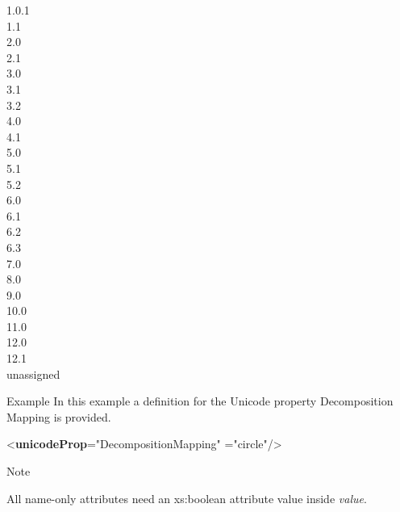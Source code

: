\begin{reflist}
\begin{sansreflist}
\begin{reflist}
\begin{description}
\item[{1.0.1}]
\item[{1.1}]
\item[{2.0}]
\item[{2.1}]
\item[{3.0}]
\item[{3.1}]
\item[{3.2}]
\item[{4.0}]
\item[{4.1}]
\item[{5.0}]
\item[{5.1}]
\item[{5.2}]
\item[{6.0}]
\item[{6.1}]
\item[{6.2}]
\item[{6.3}]
\item[{7.0}]
\item[{8.0}]
\item[{9.0}]
\item[{10.0}]
\item[{11.0}]
\item[{12.0}]
\item[{12.1}]
\item[{unassigned}]
\end{description} 
\end{reflist}  
\end{sansreflist}  
    \item[{Example}]
  In this example a definition for the Unicode property  {\name Decomposition Mapping} is provided.\leavevmode\bgroup{}\exampleFont \begin{shaded}\noindent\mbox{}{<\textbf{unicodeProp}\hspace*{1em}{name}="{Decomposition\textunderscore Mapping}"\mbox{}\newline 
\hspace*{1em}{value}="{circle}"/>}\end{shaded}\egroup 


    \item[{Note}]
  \par
All name-only attributes need an xs:boolean attribute value inside {\itshape value}.
\end{reflist}  
